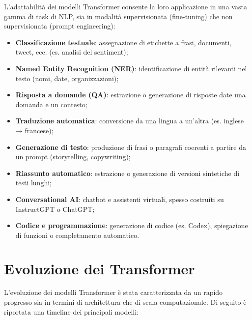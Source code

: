 L’adattabilità dei modelli Transformer consente la loro applicazione in una vasta gamma di task di NLP, sia in modalità supervisionata (fine-tuning) che non supervisionata (prompt engineering):

\begin{itemize}
    \item \textbf{Classificazione testuale}: assegnazione di etichette a frasi, documenti, tweet, ecc. (es. analisi del sentiment);
    \item \textbf{Named Entity Recognition (NER)}: identificazione di entità rilevanti nel testo (nomi, date, organizzazioni);
    \item \textbf{Risposta a domande (QA)}: estrazione o generazione di risposte date una domanda e un contesto;
    \item \textbf{Traduzione automatica}: conversione da una lingua a un’altra (es. inglese → francese);
    \item \textbf{Generazione di testo}: produzione di frasi o paragrafi coerenti a partire da un prompt (storytelling, copywriting);
    \item \textbf{Riassunto automatico}: estrazione o generazione di versioni sintetiche di testi lunghi;
    \item \textbf{Conversational AI}: chatbot e assistenti virtuali, spesso costruiti su InstructGPT o ChatGPT;
    \item \textbf{Codice e programmazione}: generazione di codice (es. Codex), spiegazione di funzioni o completamento automatico.
\end{itemize}

\section{Evoluzione dei Transformer}

L’evoluzione dei modelli Transformer è stata caratterizzata da un rapido progresso sia in termini di architettura che di scala computazionale. Di seguito è riportata una timeline dei principali modelli:

